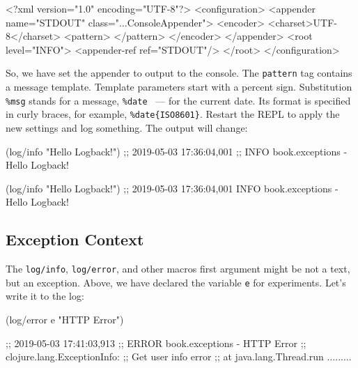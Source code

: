 \else

\begin{english}
  \begin{xml}
<?xml version="1.0" encoding="UTF-8"?>
<configuration>
  <appender name="STDOUT" class="...ConsoleAppender">
    <encoder>
      <charset>UTF-8</charset>
      <pattern>
      </pattern>
    </encoder>
  </appender>
  <root level="INFO">
    <appender-ref ref="STDOUT"/>
  </root>
</configuration>
  \end{xml}
\end{english}

\fi


So, we have set the appender to output to the console. The \verb|pattern| tag contains a message template. Template parameters start with a percent sign. Substitution \verb|%msg| stands for a message, \verb|%date| ~--- for the current date. Its format is specified in curly braces, for example, \verb|%date{ISO8601}|. Restart the REPL to apply the new settings and log something. The output will change:

\ifnarrow

\begin{clojure}
(log/info "Hello Logback!")
;; 2019-05-03 17:36:04,001
;; INFO book.exceptions - Hello Logback!
\end{clojure}

\else

\begin{clojure}
(log/info "Hello Logback!")
;; 2019-05-03 17:36:04,001 INFO book.exceptions - Hello Logback!
\end{clojure}

\fi

\subsection{Exception Context}

\label{log-ex-param}

The \verb|log/info|, \verb|log/error|, and other macros first argument might be not a text, but an exception. Above, we have declared the variable \verb|e| for experiments. Let's write it to the log:

\ifx\DEVICETYPE\MOBILE

\begin{clojure}
(log/error e "HTTP Error")

;; 2019-05-03 17:41:03,913
;; ERROR book.exceptions - HTTP Error
;; clojure.lang.ExceptionInfo:
;; Get user info error
;; at java.lang.Thread.run .........
\end{clojure}

